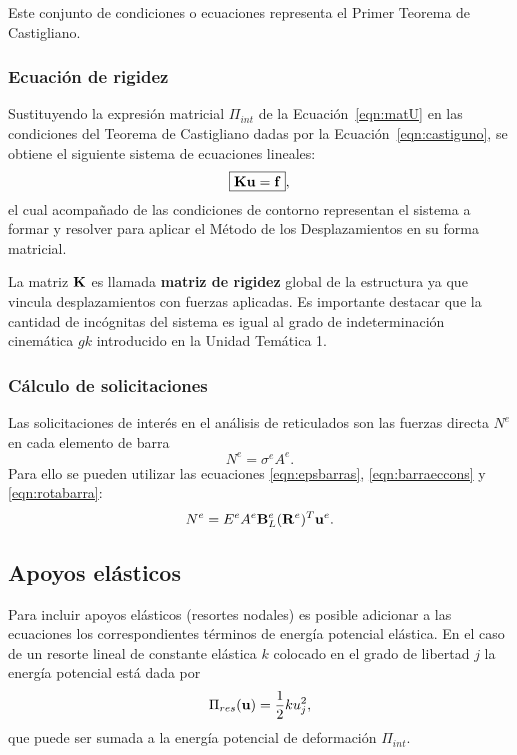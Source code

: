 Este conjunto de condiciones o ecuaciones representa el Primer Teorema de Castigliano. %
%



\subsubsection{ Ecuación de rigidez }

Sustituyendo la expresión matricial $\Pi_{int}$ de la Ecuación~\eqref{eqn:matU} en las condiciones del Teorema de Castigliano dadas por la Ecuación~\eqref{eqn:castiguno}, se obtiene el siguiente sistema de ecuaciones lineales:
%
\begin{equation}
\boxed{
	{\bf K} {\bf u} = {\bf f}
},
\end{equation}
%
el cual acompañado de las condiciones de contorno representan el sistema a formar y resolver para aplicar el Método de los Desplazamientos en su forma matricial. %

La matriz ${\bf K}$ es llamada \textbf{matriz de rigidez} global de la estructura ya que vincula desplazamientos con fuerzas aplicadas. %
%
Es importante destacar que la cantidad de incógnitas del sistema es igual al grado de indeterminación cinemática $gk$ introducido en la Unidad Temática 1.

	\subsubsection{Cálculo de solicitaciones}

Las solicitaciones de interés en el análisis de reticulados son las fuerzas directa $N^e$ en cada elemento de barra
%
\begin{equation}
N^e = \sigma^e A^e.
\end{equation}
%
Para ello se pueden utilizar las ecuaciones \eqref{eqn:epsbarras}, \eqref{eqn:barraeccons} y \eqref{eqn:rotabarra}:
%
\begin{equation}\label{eqn:expSolic}
N^e = E^e A^e {\bf B}_L^e ({\bf R}^e)^T {\bf u}^e.
\end{equation}



\subsection{Apoyos elásticos}

Para incluir apoyos elásticos (resortes nodales) es posible adicionar a las ecuaciones los correspondientes términos de energía potencial elástica. %
%
En el caso de un resorte lineal de constante elástica $k$ colocado en el grado de libertad $j$ la energía potencial está dada por
%
\begin{equation}
\Pi_{res}({\bf u}) = \frac{1}{2} k u_j^2,
\end{equation}
%
que puede ser sumada a la energía potencial de deformación $\Pi_{int}$.











